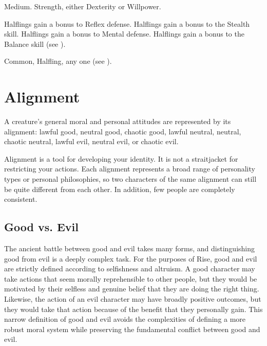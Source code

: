          Medium.
          Strength, either  Dexterity or  Willpower.
        \begin{raggeditemize}
             Halflings gain a  bonus to Reflex defense.
             Halflings gain a  bonus to the Stealth skill.
             Halflings gain a  bonus to Mental defense.
             Halflings gain a  bonus to the Balance skill (see ).
        \end{raggeditemize}
         Common, Halfling, any one  (see ).

\section{Alignment}\label{Alignment}
    A creature's general moral and personal attitudes are represented by its alignment: lawful good, neutral good, chaotic good, lawful neutral, neutral, chaotic neutral, lawful evil, neutral evil, or chaotic evil.

    Alignment is a tool for developing your identity.
    It is not a straitjacket for restricting your actions.
    Each alignment represents a broad range of personality types or personal philosophies, so two characters of the same alignment can still be quite different from each other.
    In addition, few people are completely consistent.

    \subsection{Good vs. Evil}
        The ancient battle between good and evil takes many forms, and distinguishing good from evil is a deeply complex task.
        For the purposes of Rise, good and evil are strictly defined according to selfishness and altruism.
        A good character may take actions that seem morally reprehensible to other people, but they would be motivated by their selfless and genuine belief that they are doing the right thing.
        Likewise, the action of an evil character may have broadly positive outcomes, but they would take that action because of the benefit that they personally gain.
        This narrow definition of good and evil avoids the complexities of defining a more robust moral system while preserving the fundamental conflict between good and evil.

